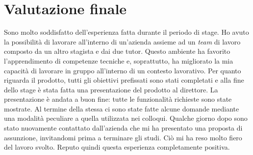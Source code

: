 \section{Valutazione finale}
Sono molto soddisfatto dell'esperienza fatta durante il periodo di stage. Ho avuto la possibilità di lavorare all'interno di un'azienda assieme ad un \textit{team} di lavoro composto da un altro stagista e dai due tutor. Questo ambiente ha favorito l'apprendimento di competenze tecniche e, soprattutto, ha migliorato la mia capacità di lavorare in gruppo all'interno di un contesto lavorativo. Per quanto riguarda il prodotto, tutti gli obiettivi prefissati sono stati completati e alla fine dello stage è stata fatta una presentazione del prodotto al direttore. La presentazione è andata a buon fine: tutte le funzionalità richieste sono state mostrate. Al termine della stessa ci sono state fatte alcune domande mediante una modalità peculiare a quella utilizzata nei colloqui. Qualche giorno dopo sono stato nuovamente contattato dall'azienda che mi ha presentato una proposta di assunzione, invitandomi prima a terminare gli studi. Ciò mi ha reso molto fiero del lavoro svolto. Reputo quindi questa esperienza completamente positiva.